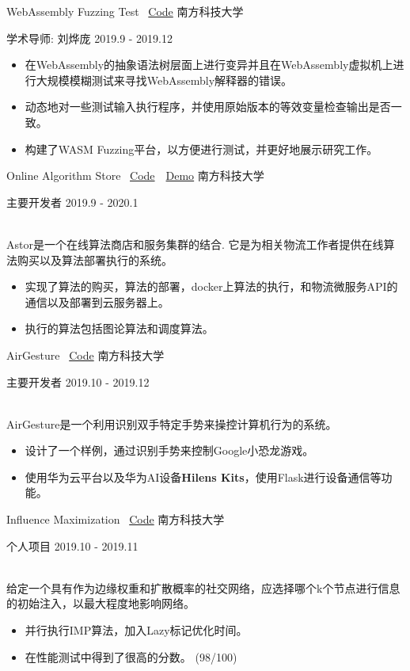 \documentclass[10pt,a4paper]{article}
\begin{document}
\spacedhrule{1.6em}{-0.4em}



\headedsection
  {WebAssembly Fuzzing Test \faGithub~\href{https://github.com/Eveneko/WASM-Fuzzing-Platform}{Code}}
  {\textsc{南方科技大学}} {%
  \headedsubsection
    {学术导师: 刘烨庞}
    {2019.9 - 2019.12}
    {
      \begin{itemize} 
        \item 在WebAssembly的抽象语法树层面上进行变异并且在WebAssembly虚拟机上进行大规模模糊测试来寻找WebAssembly解释器的错误。
        \item 动态地对一些测试输入执行程序，并使用原始版本的等效变量检查输出是否一致。
        \item 构建了WASM Fuzzing平台，以方便进行测试，并更好地展示研究工作。
      \end{itemize}
    }
}

\spacedhrule{0.5em}{-0.4em}


\headedsection
  {Online Algorithm Store \faGithub~\href{https://github.com/Eveneko/Astor}{Code}~\faLink~\href{https://astor.eveneko.com}{Demo}} 
  {\textsc{南方科技大学}} {%
  \headedsubsection
    {主要开发者}
    {2019.9 - 2020.1}
    {
      \\
      Astor是一个在线算法商店和服务集群的结合. 它是为相关物流工作者提供在线算法购买以及算法部署执行的系统。
      \begin{itemize}
        \item 实现了算法的购买，算法的部署，docker上算法的执行，和物流微服务API的通信以及部署到云服务器上。
        \item 执行的算法包括图论算法和调度算法。
      \end{itemize}
    }
}

\headedsection
  {AirGesture \faGithub~\href{https://github.com/Eveneko/AirGesture}{Code}}
  {\textsc{南方科技大学}} {%
  \headedsubsection
    {主要开发者}
    {2019.10 - 2019.12}
    {
      \\
      AirGesture是一个利用识别双手特定手势来操控计算机行为的系统。
      \begin{itemize}
        \item 设计了一个样例，通过识别手势来控制Google小恐龙游戏。
        \item 使用华为云平台以及华为AI设备\textbf{Hilens Kits}，使用Flask进行设备通信等功能。
      \end{itemize}
    }
}

\headedsection
  {Influence Maximization \faGithub~\href{https://github.com/Eveneko/SUSTech-Courses/tree/master/CS303-Artifical-Intelligence/IMP}{Code}}
  {\textsc{南方科技大学}} {%
  \headedsubsection
    {个人项目}
    {2019.10 - 2019.11}
    {
      \\
      给定一个具有作为边缘权重和扩散概率的社交网络，应选择哪个k个节点进行信息的初始注入，以最大程度地影响网络。
      \begin{itemize}
        \item 并行执行IMP算法，加入Lazy标记优化时间。
        \item 在性能测试中得到了很高的分数。 (98/100)
      \end{itemize}
    }
}
\end{document}
